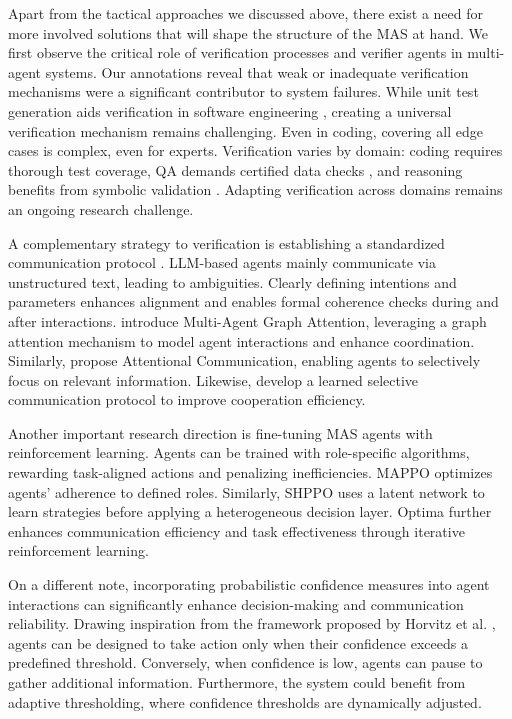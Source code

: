 Apart from the tactical approaches we discussed above, there exist a need for more involved solutions that will shape the structure of the MAS at hand. 
We first observe the critical role of verification processes and verifier agents in multi-agent systems. 
Our annotations reveal that weak or inadequate verification mechanisms were a significant contributor to system failures.
While unit test generation aids verification in software engineering \cite{jain2024testgeneval}, creating a universal verification mechanism remains challenging. Even in coding, covering all edge cases is complex, even for experts. Verification varies by domain: coding requires thorough test coverage, QA demands certified data checks \cite{peng2023check}, and reasoning benefits from symbolic validation \cite{kapanipathi2020question}. Adapting verification across domains remains an ongoing research challenge.

A complementary strategy to verification is establishing a standardized communication protocol \cite{li2024survey}. 
LLM-based agents mainly communicate via unstructured text, leading to ambiguities. Clearly defining intentions and parameters enhances alignment and enables formal coherence checks during and after interactions.
\cite{niu2021multi} introduce Multi-Agent Graph Attention, leveraging a graph attention mechanism to model agent interactions and enhance coordination. Similarly, \cite{jiang2018learning} propose Attentional Communication, enabling agents to selectively focus on relevant information. Likewise, \cite{singh2018learning} develop a learned selective communication protocol to improve cooperation efficiency.

Another important research direction is fine-tuning MAS agents with reinforcement learning. 
Agents can be trained with role-specific algorithms, rewarding task-aligned actions and penalizing inefficiencies. 
MAPPO \cite{yu2022surprising} optimizes agents' adherence to defined roles. 
Similarly, SHPPO \cite{guo2024heterogeneous} uses a latent network to learn strategies before applying a heterogeneous decision layer. 
Optima \cite{chen2024optima} further enhances communication efficiency and task effectiveness through iterative reinforcement learning.

On a different note, incorporating probabilistic confidence measures into agent interactions can significantly enhance decision-making and communication reliability. 
Drawing inspiration from the framework proposed by Horvitz et al. \cite{horvitz1999uncertainty}, agents can be designed to take action only when their confidence exceeds a predefined threshold. 
Conversely, when confidence is low, agents can pause to gather additional information. 
Furthermore, the system could benefit from adaptive thresholding, where confidence thresholds are dynamically adjusted.  

